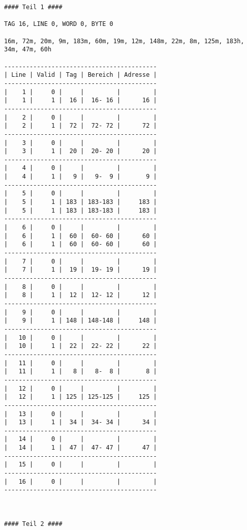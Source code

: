 \documentclass[10pt,a4paper]{article}
\begin{document}
\begin{lstlisting}
#### Teil 1 ####

TAG 16, LINE 0, WORD 0, BYTE 0

16m, 72m, 20m, 9m, 183m, 60m, 19m, 12m, 148m, 22m, 8m, 125m, 183h, 34m, 47m, 60h

------------------------------------------
| Line | Valid | Tag | Bereich | Adresse |
------------------------------------------
|    1 |     0 |     |         |         |
|    1 |     1 |  16 |  16- 16 |      16 |
------------------------------------------
|    2 |     0 |     |         |         |
|    2 |     1 |  72 |  72- 72 |      72 |
------------------------------------------
|    3 |     0 |     |         |         |
|    3 |     1 |  20 |  20- 20 |      20 |
------------------------------------------
|    4 |     0 |     |         |         |
|    4 |     1 |   9 |   9-  9 |       9 |
------------------------------------------
|    5 |     0 |     |         |         |
|    5 |     1 | 183 | 183-183 |     183 |
|    5 |     1 | 183 | 183-183 |     183 |
------------------------------------------
|    6 |     0 |     |         |         |
|    6 |     1 |  60 |  60- 60 |      60 |
|    6 |     1 |  60 |  60- 60 |      60 |
------------------------------------------
|    7 |     0 |     |         |         |
|    7 |     1 |  19 |  19- 19 |      19 |
------------------------------------------
|    8 |     0 |     |         |         |
|    8 |     1 |  12 |  12- 12 |      12 |
------------------------------------------
|    9 |     0 |     |         |         |
|    9 |     1 | 148 | 148-148 |     148 |
------------------------------------------
|   10 |     0 |     |         |         |
|   10 |     1 |  22 |  22- 22 |      22 |
------------------------------------------
|   11 |     0 |     |         |         |
|   11 |     1 |   8 |   8-  8 |       8 |
------------------------------------------
|   12 |     0 |     |         |         |
|   12 |     1 | 125 | 125-125 |     125 |
------------------------------------------
|   13 |     0 |     |         |         |
|   13 |     1 |  34 |  34- 34 |      34 |
------------------------------------------
|   14 |     0 |     |         |         |
|   14 |     1 |  47 |  47- 47 |      47 |
------------------------------------------
|   15 |     0 |     |         |         |
------------------------------------------
|   16 |     0 |     |         |         |
------------------------------------------



#### Teil 2 ####


\end{lstlisting}
\end{document}
